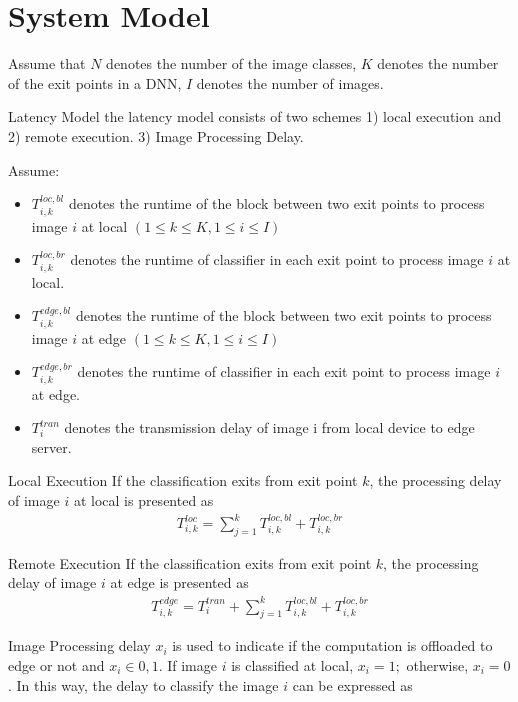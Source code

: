 \section{System Model}
	Assume that $ N $ denotes the number of the image classes, $ K $ denotes the number of the exit points in a DNN, $ I $ denotes the number of images.
	\begin{enumdescript}
		\item[Latency Model] the latency model consists of two schemes 1) local execution and 2) remote execution. 3) Image Processing Delay.
		
		Assume:
		\begin{itemize}
			\item $T_{i,k}^{loc,bl}$ denotes the runtime of the block between two exit points to process image $ i $ at local $(1 \leq k \leq K, 1 \leq i \leq I)$
			\item $T_{i,k}^{loc,br}$ denotes the runtime of classifier in each exit point to process image $i$ at local.
			\item $T_{i,k}^{edge,bl}$ denotes the runtime of the block between two exit points to process image $ i $ at edge $(1 \leq k \leq K, 1 \leq i \leq I)$
			\item $T_{i,k}^{edge,br}$ denotes the runtime of classifier in each exit point to process image $i$ at edge.
			\item $ T_{i}^{tran} $ denotes the transmission delay of image i from local device to edge server.
		\end{itemize}
		\begin{enumdescript}
			\item[Local Execution] If the classification exits from exit point $ k $, the processing delay of image $ i $ at local is presented as
			\begin{align}
			T_{i,k}^{loc}=\sum_{j=1}^{k} T_{i,k}^{loc,bl} + T_{i,k}^{loc,br} 
			\end{align}
			\item[Remote Execution] If the classification exits from exit point $ k $, the processing delay of image $ i $ at edge is presented as
			\begin{align}
			T_{i,k}^{edge}=T_{i}^{tran}+\sum_{j=1}^{k} T_{i,k}^{loc,bl} + T_{i,k}^{loc,br}
			\end{align}
			\item[Image Processing delay] $ x_i $ is used to indicate if the computation is offloaded to edge or not and $ x_i \in 0,1$. If image $ i $ is classified at local, $ x_i = 1; $ otherwise, $ x_i = 0 $. In this way, the delay to classify the image $ i $ can be expressed as

\end{enumdescript}
\end{enumdescript}
